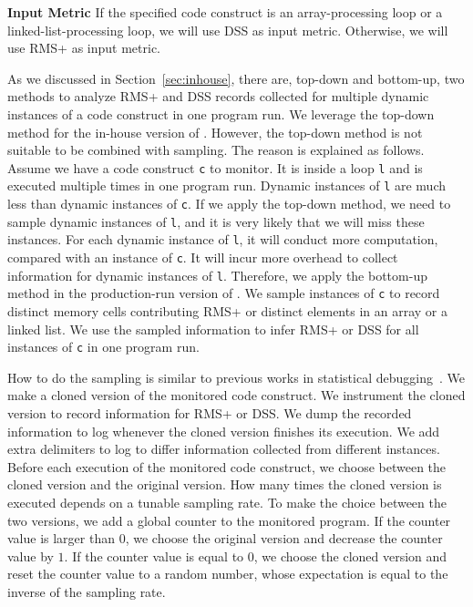 \noindent\textbf{Input Metric}
If the specified code construct is an array-processing loop 
or a linked-list-processing loop,
we will use DSS as input metric. 
Otherwise, we will use RMS+ as input metric. 

As we discussed in Section~\ref{sec:inhouse}, 
there are, top-down and bottom-up, 
two methods to analyze RMS+ and DSS records collected 
for multiple dynamic instances of a code construct in one program run. 
We leverage the top-down method for the in-house version of \Tool. 
However, the top-down method is not suitable to be combined with sampling. 
The reason is explained as follows.
Assume we have a code construct \texttt{c} to monitor. 
It is inside a loop \texttt{l} and is executed multiple times in one program run.
Dynamic instances of \texttt{l} are much less than 
dynamic instances of \texttt{c}.
If we apply the top-down method, 
we need to sample dynamic instances of \texttt{l}, 
and it is very likely that we will miss these instances. 
For each dynamic instance of \texttt{l}, 
it will conduct more computation, 
compared with an instance of \texttt{c}.
It will incur more overhead to collect 
information for dynamic instances of \texttt{l}.
Therefore, we apply the bottom-up method 
in the production-run version of \Tool.
We sample instances of \texttt{c} to record 
distinct memory cells contributing RMS+ 
or distinct elements in an array or a linked list.
We use the sampled information to infer RMS+ 
or DSS for all instances of \texttt{c} in one program run.


How to do the sampling is similar to previous works in statistical 
debugging~\cite{liblit03,liblit05,CCI,SongOOPSLA2014,ldoctor}.
We make a cloned version of the monitored code construct.
We instrument the cloned version to record information for RMS+ or DSS. 
We dump the recorded information to log 
whenever the cloned version finishes its execution. 
We add extra delimiters to log to differ information collected from different instances.
Before each execution of the monitored code construct, 
we choose between the cloned version and the original version. 
How many times the cloned version is executed 
depends on a tunable sampling rate. 
To make the choice between the two versions,
we add a global counter to the monitored program. 
If the counter value is larger than $0$, 
we choose the original version and decrease the counter value by $1$.
If the counter value is equal to $0$,
we choose the cloned version and reset the counter value to 
a random number, 
whose expectation is equal to the inverse of the sampling rate.  


